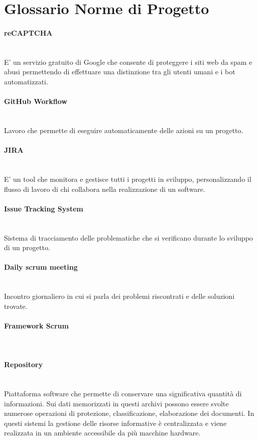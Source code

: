 \section{Glossario Norme di Progetto}

\paragraph{reCAPTCHA}~\smallskip \\
E' un servizio gratuito di Google che consente di proteggere i siti web da spam e abusi permettendo di effettuare una distinzione tra gli utenti umani e i bot automatizzati.

\paragraph{GitHub Workflow}~\smallskip \\
Lavoro che permette di eseguire automaticamente delle azioni su un progetto.

\paragraph{JIRA}~\smallskip \\
E' un tool che monitora e gestisce tutti i progetti in sviluppo, personalizzando il flusso di lavoro di chi collabora nella realizzazione di un software.

\paragraph{Issue Tracking System}~\smallskip \\
Sistema di tracciamento delle problematiche che si verificano durante lo sviluppo di un progetto.

\paragraph{Daily scrum meeting}~\smallskip \\
Incontro giornaliero in cui si parla dei problemi riscontrati e delle soluzioni trovate.

\paragraph{Framework Scrum}~\smallskip \\

\paragraph{Repository}~\smallskip \\
Piattaforma software che permette di conservare una significativa quantità di informazioni. Sui dati memorizzati in questi archivi possono essere svolte numerose operazioni di protezione, classificazione, elaborazione dei documenti. In questi sistemi la gestione delle risorse informative è centralizzata e viene realizzata in un ambiente accessibile da più macchine hardware.

